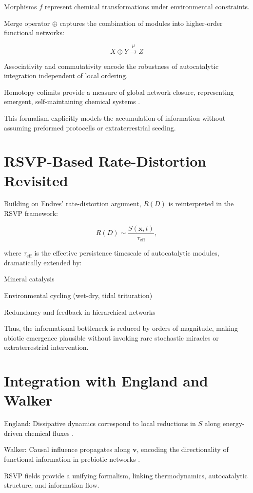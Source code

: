 \documentclass[openany]{book}
\begin{document}
Morphisms $f$ represent chemical transformations under environmental constraints.

Merge operator $\oplus$ captures the combination of modules into higher-order functional networks:

\[X \oplus Y \xrightarrow{\mu} Z\]

Associativity and commutativity encode the robustness of autocatalytic integration independent of local ordering.

Homotopy colimits provide a measure of global network closure, representing emergent, self-maintaining chemical systems \citep{steel2013}.

This formalism explicitly models the accumulation of information without assuming preformed protocells or extraterrestrial seeding.

\section{RSVP-Based Rate-Distortion Revisited}
Building on Endres’ rate-distortion argument, $R(D)$ is reinterpreted in the RSVP framework:

\[R(D) \sim \frac{S(\mathbf{x}, t)}{\tau_{\mathrm{eff}}},\]

where $\tau_{\mathrm{eff}}$ is the effective persistence timescale of autocatalytic modules, dramatically extended by:

Mineral catalysis \citep{hazen2005}

Environmental cycling (wet-dry, tidal trituration)

Redundancy and feedback in hierarchical networks \citep{peng2022}

Thus, the informational bottleneck is reduced by orders of magnitude, making abiotic emergence plausible without invoking rare stochastic miracles or extraterrestrial intervention.

\section{Integration with England and Walker}
England: Dissipative dynamics correspond to local reductions in $S$ along energy-driven chemical fluxes \citep{england2015}.

Walker: Causal influence propagates along $\mathbf{v}$, encoding the directionality of functional information in prebiotic networks \citep{walker2017}.

RSVP fields provide a unifying formalism, linking thermodynamics, autocatalytic structure, and information flow.
\end{document}
